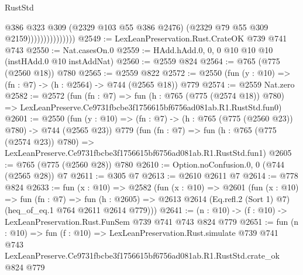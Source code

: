 \begin{lexlean}{RustStd}
\begin{coremodule}
                                @386
                                @323
                                @309
                                (@2329 @103 @55 @386 @2476)
                                (@2329 @79 @55 @309 @2159)))))))))))))))
@2549 := LexLeanPreservation.Rust.CrateOK @739 @741 @743
@2550 := Nat.casesOn.{0}
@2559 := HAdd.hAdd.{0, 0, 0} @10 @10 @10 (instHAdd.{0} @10 instAddNat)
@2560 := @2559 @824
@2564 := @765 (@775 (@2560 @18)) @780
@2565 := @2559 @822
@2572 := @2550 (fun (y : @10) => (fn : @7) -> (h : @2564) -> @744 (@2565 @18)) @779
@2574 := @2559 Nat.zero
@2582 := @2572
    (fun (fn : @7) =>
    fun (h : @765 (@775 (@2574 @18)) @780) =>
    LexLeanPreserve.Ce9731fbcbe3f1756615bf6756ad081ab.R1.RustStd.fun0)
@2601 := @2550
    (fun (y : @10) => (fn : @7) -> (h : @765 (@775 (@2560 @23)) @780) -> @744 (@2565 @23))
    @779
    (fun (fn : @7) =>
    fun (h : @765 (@775 (@2574 @23)) @780) =>
    LexLeanPreserve.Ce9731fbcbe3f1756615bf6756ad081ab.R1.RustStd.fun1)
@2605 := @765 (@775 (@2560 @28)) @780
@2610 := Option.noConfusion.{0, 0} (@744 (@2565 @28)) @7
@2611 := @305 @7
@2613 := @2610 @2611 @7
@2614 := @778 @824
@2633 := fun (x : @10) =>
  @2582
    (fun (x : @10) =>
    @2601
      (fun (x : @10) =>
      fun (fn : @7) =>
      fun (h : @2605) =>
      @2613 @2614 (Eq.refl.{2} (Sort 1) @7) (heq_of_eq.{1} @764 @2611 @2614 @779)))
@2641 := (n : @10) -> (f : @10) -> LexLeanPreservation.Rust.FunSem @739 @741 @743 @824 @779
@2651 := fun (n : @10) =>
  fun (f : @10) =>
  LexLeanPreservation.Rust.simulate
    @739
    @741
    @743
    LexLeanPreserve.Ce9731fbcbe3f1756615bf6756ad081ab.R1.RustStd.crate_ok
    @824
    @779
\end{coremodule}
\end{lexlean}
